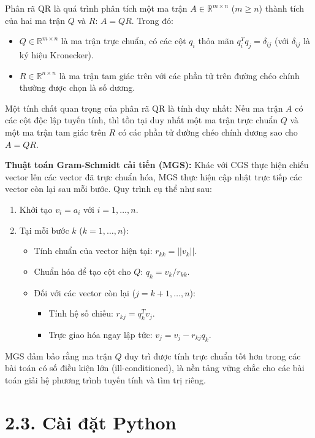 Phân rã QR là quá trình phân tích một ma trận $A \in \mathbb{R}^{m \times n}$ ($m \ge n$) thành tích của hai ma trận $Q$ và $R$: $A = QR$. Trong đó:
\begin{itemize}
    \item $Q \in \mathbb{R}^{m \times n}$ là ma trận trực chuẩn, có các cột $q_i$ thỏa mãn $q_i^T q_j = \delta_{ij}$ (với $\delta_{ij}$ là ký hiệu Kronecker).
    \item $R \in \mathbb{R}^{n \times n}$ là ma trận tam giác trên với các phần tử trên đường chéo chính thường được chọn là số dương.
\end{itemize}

Một tính chất quan trọng của phân rã QR là tính duy nhất: Nếu ma trận $A$ có các cột độc lập tuyến tính, thì tồn tại duy nhất một ma trận trực chuẩn $Q$ và một ma trận tam giác trên $R$ có các phần tử đường chéo chính dương sao cho $A=QR$.

\textbf{Thuật toán Gram-Schmidt cải tiến (MGS):}
Khác với CGS thực hiện chiếu vector lên các vector đã trực chuẩn hóa, MGS thực hiện cập nhật trực tiếp các vector còn lại sau mỗi bước. Quy trình cụ thể như sau:
\begin{enumerate}
    \item Khởi tạo $v_i = a_i$ với $i=1, \dots, n$.
    \item Tại mỗi bước $k$ ($k=1, \dots, n$):
    \begin{itemize}
        \item Tính chuẩn của vector hiện tại: $r_{kk} = ||v_k||$.
        \item Chuẩn hóa để tạo cột cho $Q$: $q_k = v_k / r_{kk}$.
        \item Đối với các vector còn lại ($j = k+1, \dots, n$):
        \begin{itemize}
            \item Tính hệ số chiếu: $r_{kj} = q_k^T v_j$.
            \item Trực giao hóa ngay lập tức: $v_j = v_j - r_{kj}q_k$.
        \end{itemize}
    \end{itemize}
\end{enumerate}

MGS đảm bảo rằng ma trận $Q$ duy trì được tính trực chuẩn tốt hơn trong các bài toán có số điều kiện lớn (ill-conditioned), là nền tảng vững chắc cho các bài toán giải hệ phương trình tuyến tính và tìm trị riêng.

\section*{2.3. Cài đặt Python}
{}

